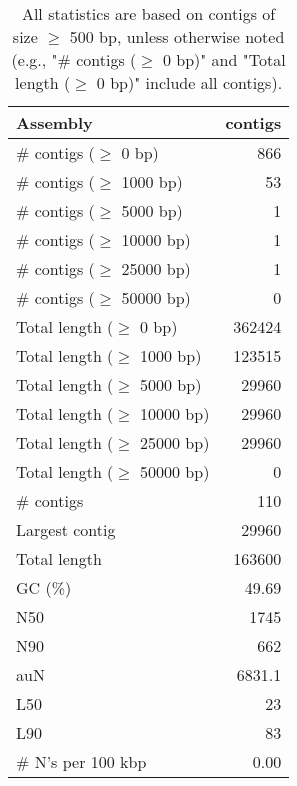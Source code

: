 \documentclass[12pt,a4paper]{article}
\begin{document}
\begin{table}[ht]
\begin{center}
\caption{All statistics are based on contigs of size $\geq$ 500 bp, unless otherwise noted (e.g., "\# contigs ($\geq$ 0 bp)" and "Total length ($\geq$ 0 bp)" include all contigs).}
\begin{tabular}{|l*{1}{|r}|}
\hline
Assembly & contigs \\ \hline
\# contigs ($\geq$ 0 bp) & 866 \\ \hline
\# contigs ($\geq$ 1000 bp) & 53 \\ \hline
\# contigs ($\geq$ 5000 bp) & 1 \\ \hline
\# contigs ($\geq$ 10000 bp) & 1 \\ \hline
\# contigs ($\geq$ 25000 bp) & 1 \\ \hline
\# contigs ($\geq$ 50000 bp) & 0 \\ \hline
Total length ($\geq$ 0 bp) & 362424 \\ \hline
Total length ($\geq$ 1000 bp) & 123515 \\ \hline
Total length ($\geq$ 5000 bp) & 29960 \\ \hline
Total length ($\geq$ 10000 bp) & 29960 \\ \hline
Total length ($\geq$ 25000 bp) & 29960 \\ \hline
Total length ($\geq$ 50000 bp) & 0 \\ \hline
\# contigs & 110 \\ \hline
Largest contig & 29960 \\ \hline
Total length & 163600 \\ \hline
GC (\%) & 49.69 \\ \hline
N50 & 1745 \\ \hline
N90 & 662 \\ \hline
auN & 6831.1 \\ \hline
L50 & 23 \\ \hline
L90 & 83 \\ \hline
\# N's per 100 kbp & 0.00 \\ \hline
\end{tabular}
\end{center}
\end{table}
\end{document}
